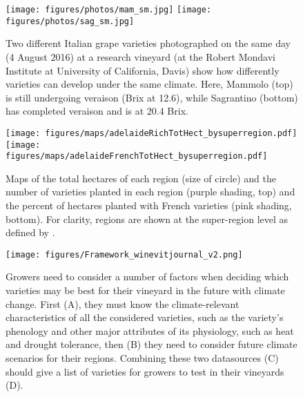 \documentclass[11pt,letterpaper]{article}
\begin{document}
\begin{figure}[t!]
\centering
\texttt{[image: figures/photos/mam\_sm.jpg]}
\texttt{[image: figures/photos/sag\_sm.jpg]}
\caption{Two different Italian grape varieties photographed on the same day (4 August 2016) at a research vineyard (at the Robert Mondavi Institute at University of California, Davis) show how differently varieties can develop under the same climate. Here, Mammolo (top) is still undergoing veraison (Brix at 12.6), while Sagrantino (bottom) has completed veraison and is at 20.4 Brix.}
  \label{fig:photos}
\end{figure}
\clearpage 

\begin{figure}[t!]
\centering
\texttt{[image: figures/maps/adelaideRichTotHect\_bysuperregion.pdf]}
\texttt{[image: figures/maps/adelaideFrenchTotHect\_bysuperregion.pdf]}
\caption{Maps of the total hectares of each region (size of circle) and the number of varieties planted in each region (purple shading, top) and the percent of hectares planted with French varieties (pink shading, bottom). For clarity, regions are shown at the super-region level as defined by \citet{ozclarke}.}
  \label{fig:maps}
\end{figure}
\clearpage


\begin{figure}[t!]
\centering
\texttt{[image: figures/Framework\_winevitjournal\_v2.png]}
\caption{Growers need to consider a number of factors when deciding which varieties may be best for their vineyard in the future with climate change. First (A), they must know the climate-relevant characteristics of all the considered varieties, such as the variety's phenology and other major attributes of its physiology, such as heat and drought tolerance, then (B) they need to consider future climate scenarios for their regions. Combining these two datasources (C) should give a list of varieties for growers to test in their vineyards (D). }
  \label{fig:framework}
\end{figure}
\clearpage
\end{document}
